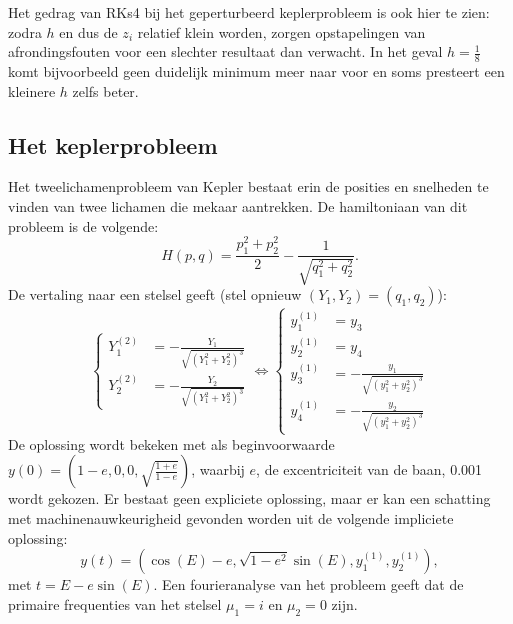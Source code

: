 \documentclass[12pt]{article}
\begin{document}
Het gedrag van RKs4 bij het geperturbeerd keplerprobleem is ook hier te zien: zodra \(h\) en dus de \(z_i\) relatief klein worden, zorgen opstapelingen van afrondingsfouten voor een slechter resultaat dan verwacht. In het geval \(h=\frac{1}{8}\) komt bijvoorbeeld geen duidelijk minimum meer naar voor en soms presteert een kleinere \(h\) zelfs beter.

\subsection{Het keplerprobleem}
Het tweelichamenprobleem van Kepler bestaat erin de posities en snelheden te vinden van twee lichamen die mekaar aantrekken. De hamiltoniaan van dit probleem is de volgende:
\[H(p,q)=\frac{p_1^2+p_2^2}{2}-\frac{1}{\sqrt{q_1^2+q_2^2}}.\]
De vertaling naar een stelsel geeft (stel opnieuw \((Y_1,Y_2)=(q_1,q_2)\)):
\begin{equation} \label{eq:keplersys}
    \begin{cases}
        Y_1^{(2)}&=-\frac{Y_1}{\sqrt{(Y_1^2+Y_2^2)^3}} \\
        Y_2^{(2)}&=-\frac{Y_2}{\sqrt{(Y_1^2+Y_2^2)^3}}
    \end{cases}\Leftrightarrow
    \begin{cases}
        y_1^{(1)}&=y_3 \\
        y_2^{(1)}&=y_4 \\
        y_3^{(1)}&=-\frac{y_1}{\sqrt{(y_1^2+y_2^2)^3}} \\
        y_4^{(1)}&=-\frac{y_2}{\sqrt{(y_1^2+y_2^2)^3}}
    \end{cases}
\end{equation}
De oplossing wordt bekeken met als beginvoorwaarde \(y(0)=\left(1-e,0,0,\sqrt{\frac{1+e}{1-e}}\right)\), waarbij \(e\), de excentriciteit van de baan, 0.001 wordt gekozen. Er bestaat geen expliciete oplossing, maar er kan een schatting met machinenauwkeurigheid gevonden worden uit de volgende impliciete oplossing:
\[y(t)=(\cos(E)-e,\sqrt{1-e^2}\sin(E),y_1^{(1)},y_2^{(1)}),\]
met \(t=E-e\sin(E)\). Een fourieranalyse van het probleem geeft dat de primaire frequenties van het stelsel \(\mu_1=i\) en \(\mu_2=0\) zijn. 
\end{document}
